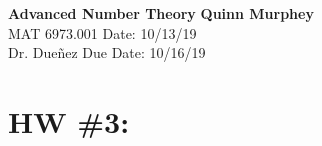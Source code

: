 \documentclass[letterpaper, 12pt]{article}
\begin{document}
\noindent
\large\textbf{Advanced Number Theory} \hfill \textbf{Quinn Murphey} \\
\normalsize MAT 6973.001 \hfill Date: 10/13/19 \\
Dr. Dueñez \hfill Due Date: 10/16/19 \\
\noindent\makebox[\linewidth]{\rule{\paperwidth}{0.4pt}}
\section*{HW \#3:}
 
\end{document}
